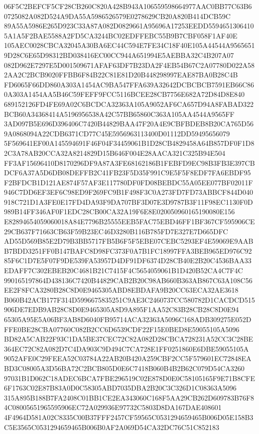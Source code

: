 \documentclass[UTF8,fontset=fandol,zihao=-4,a4paper]{ctexart}
\begin{document}
{{06F5C2BEFCF5CF28CB260C820A428B943A106559598664977AAC0BB77C63B60725082A082D524A9DA55A5986526579E0278629CB20A820B414DCB59C
89A55A5986E265D923C33A87A082D0829661A95696A17253EEDD55946513064105A1A5F2BAE5588A2FD5CA3244BC02EDFFEBC55B9B7CBF058F1AF40E
105AEC0028CBCA32045A30BA6EC44C594E7FE34C18F40E105A44544A95656519D28C6E65D98312BD038416EC00CC944A651994E5AEBBA32C4B207A07
082D962E7297E5D001509671AFAF63DF7B23DA2F4EB54B67C2A07780D022A582AA2C2BCB9020FFBB6F84B22C81E81D20B448298997EAE87BA0B28C4B
FD6065F66DD860A303A1454AC9BA547FFA639A32642DCBCBCB7591EB66C860A303A1454AA5B46C59FEFF9FCC5116BCEE28CB7756E682A72D84D8E840
689152126FD4FE69A02C6BCDCA32363A105A9052AF6CA657D94A8FABAD322BCB60A34368414A5196956538A42C57BB65860C363A105AA4544A9565FF
3AD097B5E696D396406C7420B44829BAA47F20A4E9CBFBDEB8B20CA765D569A0868094A22CDB6371CD77C45E5956963113400D01112DD59495656079
5F569641EF00A145594691F46F04F34459061B1D28CB4829458A64B857DF0F1D82C3A78AB20CCA32A8214829D15B646F004E28AACA321C325B94E504
FF3AF15696410D8170296DF9A87A3FE68162186B1FEBFD9EC98B3FB3E397CBDCF6A37A5D6DB08DEFFB2C41FB23F5D35F991C9E5F5F8EDF7FA6EBDF95
F2BFDCB1D121AE874F57AF3E117780DF0FD08BEBDC55A05EE077BF02011F946C7DD6EF3EF6C98ED9F269FC9B1F498F3C0A273FD7FD73ABBCF844D040
918C721D1A3FE0E17FD4DA93F9DA707BF3D07E3D9787B3F11F98EC1130F0D989B14FF346AF0F1EDC28CB00CA32A19F6E8E020050960165190080E156
E82894654059060018A84E7796B25555EEB5FAC75EBD46FF1BF367CF595906CE29CB637F71663CB63F59B23EC46D3280B116B785FD7E327E7D665DFC
AD55D569B85E2D79B3BB5717FB5B6F5F5EBE07CEBC5293EF4E59069E9AABB7BDD3251FF0B147BAFC8D98FC373F0A7B1FC18997FFA3BEB965ED976C92
85F6C1D7E5F07F9DE539FA53957D4DF91DF6374D28CB40E2B20C4536BAA33EDAFF7C302EBEB20C4681B21C7415F4C5654059061B1D420B52CA4C7F4C
990165197864D438136C7420B44829CAB2B20C98AB660B363AB867C63A108C56EE2F8FCA3280B28C8D0E9465305ABD8EBDAFA9B20CC63ECA32AE3618
B060B42ACB177F314D5996675835251C9AE3C2460737CC580782D1CACDCD515906DE7EDB9AB28C8D0E9465305A8D9A895F1AA52C83B28CB28C8D0E94
65305A95E5A06BF3AB8D6040FB95714ACA32363A5096C168ADB309275E052DFFE0BE28CBA07760C082B2CC6D6539CDF22F15E0BED8E59055105A5096
BD82A5CAB22F93C1DA5BE37CEC72C82A082D28CBCA728231A52CC3C28BE364EC72C82A082D7C4DA903C9D494C7CA728E1FF0251860E6DBE59055105A
9052AFE0C29FEEA52C03784A22AB20B420A259CBF2CC5F579601EC72848EABD3C08005A3D56BA72C2BCB805D0E6C7418B060B4B2B62C079D54CA3260
97031B1D062C18ADEC6BCA7FBE296519C02E878D0E0C58105165F9E71B8CFE6F1763C02E87B83A0D0C58305ABD7035DBA2B20C3C326D1C08363A5096
315A895B188B7FA2408C01BB1CE2EA343060C168F5AA29CB262D609783B76F84C08005651965595906EC72A029936E97732C5803D8DA167DAE408601
4F4964D581A02C8335C00B37FFF2457CF59565C0531294659465B006D05E158B3C5E3565C0531294659465B006B0AF2A069D54CA32DC76C51C852183
}}
\end{document}
